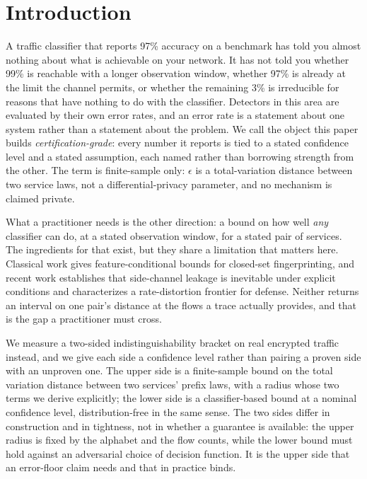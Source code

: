 \section{Introduction}
\label{sec:intro}

A traffic classifier that reports 97\% accuracy on a benchmark has told you
almost nothing about what is achievable on your network. It has not told you
whether 99\% is reachable with a longer observation window, whether 97\% is
already at the limit the channel permits, or whether the remaining 3\% is
irreducible for reasons that have nothing to do with the classifier. Detectors
in this area are evaluated by their own error rates, and an error rate is a
statement about one system rather than a statement about the problem. We call the
object this paper builds \emph{certification-grade}: every number it reports is
tied to a stated confidence level and a stated assumption, each named rather than
borrowing strength from the other. The term is finite-sample only:
$\epsilon$ is a total-variation distance between two service laws, not a
differential-privacy parameter, and no mechanism is claimed private.

What a practitioner needs is the other direction: a bound on how well
\emph{any} classifier can do, at a stated observation window, for a stated pair
of services. The ingredients for that exist, but they share a limitation that
matters here. Classical work gives feature-conditional bounds for closed-set
fingerprinting, and recent work establishes that side-channel leakage is
inevitable under explicit conditions and characterizes a rate-distortion
frontier for defense. Neither returns an interval on one pair's distance at the flows
a trace actually provides, and that is the gap a practitioner must cross.

We measure a two-sided indistinguishability bracket on real encrypted traffic
instead, and we give each side a confidence level rather than pairing a proven
side with an unproven one. The upper side is a finite-sample bound on the total
variation distance between two services' prefix laws, with a radius whose two
terms we derive explicitly; the lower side is a classifier-based bound at a
nominal confidence level, distribution-free in the same sense. The two sides
differ in construction and in tightness, not in whether a guarantee is available:
the upper radius is fixed by the alphabet and the flow counts, while the lower
bound must hold against an adversarial choice of decision function. It is the
upper side that an error-floor claim needs and that in practice binds.

